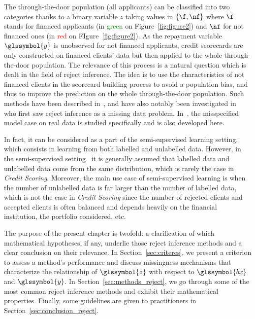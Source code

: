 The through-the-door population (all applicants) can be classified into two categories thanks to a binary variable $z$ taking values in $\{\f,\nf\}$ where $\f$ stands for financed applicants (in \textcolor{green}{green} on Figure~\ref{fig:figure2}) and $\nf$ for not financed ones (in \textcolor{red}{red} on FIgure~\ref{fig:figure2}). As the repayment variable $\glssymbol{y}$ is unobserved for not financed applicants, credit scorecards are only constructed on financed clients' data but then applied to the whole  through-the-door population. The relevance of this process is a natural question which is dealt in the field of {reject inference}. The idea is to use the characteristics of not financed clients in the scorecard building process to avoid a population bias, and thus to improve the prediction on the whole through-the-door population. Such methods have been described in~\cite{RI6,saporta,banasik,economix}, and have also notably been investigated in~\cite{RI2} who first saw {reject inference} as a missing data problem. In~\cite{RI3}, the misspecified model case on real data is studied specifically and is also developed here.


In fact, it can be considered as a part of the semi-supervised learning setting, which consists in learning from both labelled and unlabelled data. However, in the semi-supervised setting~\cite{ChaSchZie06} it is generally assumed that labelled data and unlabelled data come from the same distribution, which is rarely the case in \textit{Credit Scoring}. Moreover, the main use case of semi-supervised learning is when the number of unlabelled data is far larger than the number of labelled data, which is not the case in \textit{Credit Scoring} since the number of rejected clients and accepted clients is often balanced and depends heavily on the financial institution, the portfolio considered, etc.


The purpose of the present chapter is twofold: a clarification of which mathematical hypotheses, if any, underlie those reject inference methods and a clear conclusion on their relevance. In Section~\ref{sec:criteres}, we present a criterion to assess a method's performance and discuss missingness mechanisms that characterize the relationship of $\glssymbol{z}$ with respect to $\glssymbol{bx}$ and $\glssymbol{y}$. In Section~\ref{sec:methods_reject}, we go through some of the most common reject inference methods and exhibit their mathematical properties. 
Finally, some guidelines are given to practitioners in Section~\ref{sec:conclusion_reject}.

